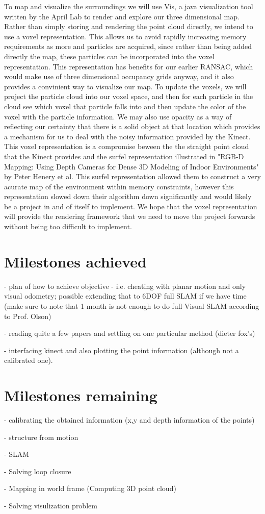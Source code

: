 \documentclass[12pt]{article}
\begin{document}
	To map and visualize the surroundings we will use Vis, a java visualization tool written by the April Lab to render and explore our three dimensional map.   Rather than simply storing and rendering the point cloud directly, we intend to use a voxel representation.  This allows us to avoid rapidly increasing memory requirements as more and particles are acquired, since rather than being added directly the map, these particles can be incorporated into the voxel representation.  This representation has benefits for our earlier RANSAC, which would make use of three dimensional occupancy grids anyway, and it also provides a convinient way to visualize our map.  To update the voxels, we will project the particle cloud into our voxel space, and then for each particle in the cloud see which voxel that particle falls into and then update the color of the voxel with the particle information.  We may also use opacity as a way of reflecting our certainty that there is a solid object at that location which provides a mechanism for us to deal with the noisy information provided by the Kinect.  This voxel representation is a compromise beween the the straight point cloud that the Kinect provides and the surfel representation illustrated in "RGB-D Mapping: Using Depth Cameras for Dense 3D Modeling of Indoor Environments" by Peter Henery et al. This surfel representation allowed them to construct a very acurate map of the environment within memory constraints, however this representation slowed down their algorithm down significantly and would likely be a project in and of itself to implement.  We hope that the voxel representation will provide the rendering framework that we need to move the project forwards without being too difficult to implement. 

\section{Milestones achieved}
- plan of how to achieve objective - i.e. cheating with planar motion and only visual odometry; possible extending that to 6DOF full SLAM if we have time (make sure to note that 1 month is not enough to do full Visual SLAM according to Prof. Olson)

- reading quite a few papers and settling on one particular method (dieter fox's)

- interfacing kinect and also plotting the point information (although not a calibrated one).

\section{Milestones remaining}
- calibrating the obtained information (x,y and depth information of the points) 

- structure from motion

- SLAM 

- Solving loop closure 

- Mapping in world frame (Computing 3D point cloud)

- Solving visulization problem 
\end{document}
